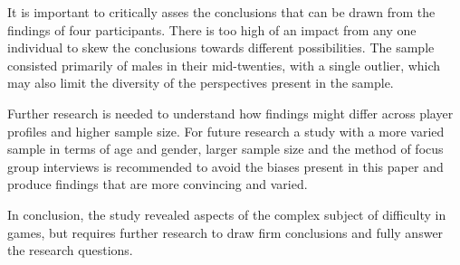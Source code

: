 It is important to critically asses the conclusions that can be drawn from the findings of four participants. There is too high of an impact from any one individual to skew the conclusions towards different possibilities. The sample consisted primarily of males in their mid-twenties, with a single outlier, which may also limit the diversity of the perspectives present in the sample. 

Further research is needed to understand how findings might differ across player profiles and higher sample size. For future research a study with a more varied sample in terms of age and gender, larger sample size and the method of focus group interviews is recommended to avoid the biases present in this paper and produce findings that are more convincing and varied.

In conclusion, the study revealed aspects of the complex subject of difficulty in games, but requires further research to draw firm conclusions and fully answer the research questions.

\clearpage